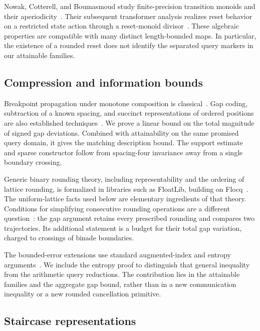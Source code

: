 \documentclass[11pt,reqno]{amsart}
\theoremstyle{definition}
\theoremstyle{remark}
\numberwithin{equation}{section}
\begin{document}
Nowak, Cotterell, and Boumasmoud study finite-precision transition monoids and
their aperiodicity~\cite[Appendix~J]{ref12}. Their subsequent transformer
analysis realizes reset behavior on a restricted state action through a
reset-monoid divisor~\cite[Appendix~C]{ref13}. These algebraic properties are
compatible with many distinct length-bounded maps. In particular, the
existence of a rounded reset does not identify the separated query markers
in our attainable families.

\subsection{Compression and information bounds}

Breakpoint propagation under monotone composition is
classical~\cite[Lemma~2.1]{ref14}. Gap coding, subtraction of a known spacing,
and succinct representations of ordered positions are also established
techniques~\cite{ref15}. We prove a linear
bound on the total magnitude of signed gap deviations. Combined with
attainability on the same promised query domain, it gives the matching
description bound. The support estimate and sparse constructor follow from
spacing-four invariance away from a single boundary crossing.

Generic binary rounding theory, including representability and the ordering
of lattice rounding, is formalized in libraries such as FloatLib, building
on Flocq~\cite[Section~2.3]{ref21}. The uniform-lattice facts used below are
elementary ingredients of that theory. Conditions for simplifying consecutive
rounding operations are a different question~\cite[Section~5.2 and
Appendix~A.2]{ref22}: the gap argument retains every prescribed rounding and
compares two trajectories. Its additional statement is a budget for their
total gap variation, charged to crossings of binade boundaries.

The bounded-error extensions use standard augmented-index and entropy
arguments~\cite{ref16}. We include the entropy proof to distinguish that
general inequality from the arithmetic query reductions. The contribution
lies in the attainable families and the aggregate gap bound, rather than in
a new communication inequality or a new rounded cancellation primitive.

\subsection{Staircase representations}
\end{document}
